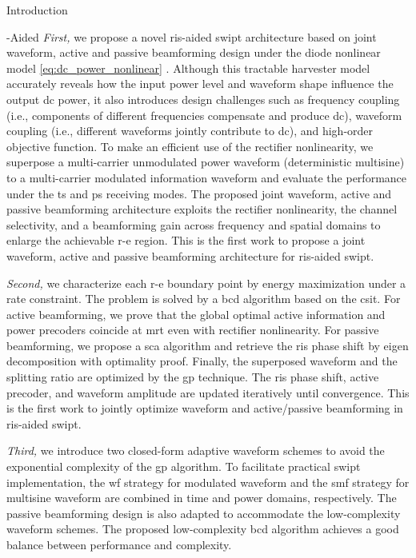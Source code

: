 \begin{section}{Introduction}
\begin{subsection}{-Aided }
		\emph{First,} we propose a novel \gls{ris}-aided \gls{swipt} architecture based on joint waveform, active and passive beamforming design under the diode nonlinear model \eqref{eq:dc_power_nonlinear} \cite{Clerckx2016a}. Although this tractable harvester model accurately reveals how the input power level and waveform shape influence the output \gls{dc} power, it also introduces design challenges such as frequency coupling (i.e., components of different frequencies compensate and produce \gls{dc}), waveform coupling (i.e., different waveforms jointly contribute to \gls{dc}), and high-order objective function. To make an efficient use of the rectifier nonlinearity, we superpose a multi-carrier unmodulated power waveform (deterministic multisine) to a multi-carrier modulated information waveform and evaluate the performance under the \gls{ts} and \gls{ps} receiving modes. The proposed joint waveform, active and passive beamforming architecture exploits the rectifier nonlinearity, the channel selectivity, and a beamforming gain across frequency and spatial domains to enlarge the achievable \gls{r-e} region. This is the first work to propose a joint waveform, active and passive beamforming architecture for \gls{ris}-aided \gls{swipt}.

		\emph{Second,} we characterize each \gls{r-e} boundary point by energy maximization under a rate constraint. The problem is solved by a \gls{bcd} algorithm based on the \gls{csit}. For active beamforming, we prove that the global optimal active information and power precoders coincide at \gls{mrt} even with rectifier nonlinearity. For passive beamforming, we propose a \gls{sca} algorithm and retrieve the \gls{ris} phase shift by eigen decomposition with optimality proof. Finally, the superposed waveform and the splitting ratio are optimized by the \gls{gp} technique. The \gls{ris} phase shift, active precoder, and waveform amplitude are updated iteratively until convergence. This is the first work to jointly optimize waveform and active/passive beamforming in \gls{ris}-aided \gls{swipt}.

		\emph{Third,} we introduce two closed-form adaptive waveform schemes to avoid the exponential complexity of the \gls{gp} algorithm. To facilitate practical \gls{swipt} implementation, the \gls{wf} strategy for modulated waveform and the \gls{smf} strategy for multisine waveform are combined in time and power domains, respectively. The passive beamforming design is also adapted to accommodate the low-complexity waveform schemes. The proposed low-complexity \gls{bcd} algorithm achieves a good balance between performance and complexity.


\end{subsection}
\end{section}
